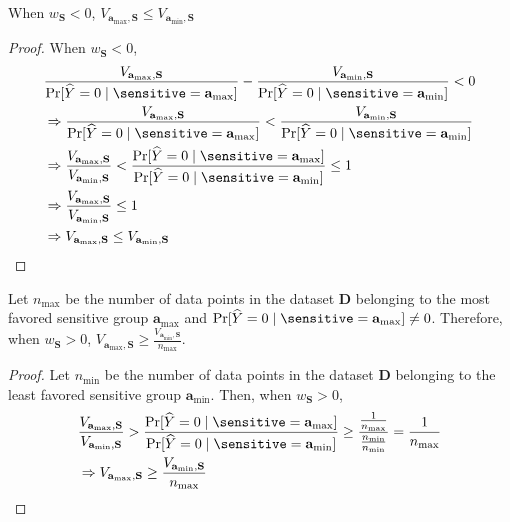 \begin{proposition}
	When $ w_{\mathbf{S}} < 0 $, $ V_{\mathbf{a}_{\max}, \mathbf{S}} \le V_{\mathbf{a}_{\min}, \mathbf{S}}  $
\end{proposition}

\begin{proof}
	When $ w_{\mathbf{S}} < 0 $,
	\begin{align*}
		&\frac{V_{\mathbf{a}_{\max}, \mathbf{S}}}{ \Pr[\widehat{Y} = 0 \mid  \sensitive = \mathbf{a}_{\max}]} - \frac{V_{\mathbf{a}_{\min}, \mathbf{S}} }{\Pr[\widehat{Y} = 0 \mid  \sensitive = \mathbf{a}_{\min}]} < 0 \\
		& \Rightarrow \frac{V_{\mathbf{a}_{\max}, \mathbf{S}}}{ \Pr[\widehat{Y} = 0 \mid  \sensitive = \mathbf{a}_{\max}]} < \frac{V_{\mathbf{a}_{\min}, \mathbf{S}} }{\Pr[\widehat{Y} = 0 \mid  \sensitive = \mathbf{a}_{\min}]} \\
		& \Rightarrow  \frac{V_{\mathbf{a}_{\max}, \mathbf{S}}}{V_{\mathbf{a}_{\min}, \mathbf{S}}} < \frac{\Pr[\widehat{Y} = 0 \mid  \sensitive = \mathbf{a}_{\max}]}{\Pr[\widehat{Y} = 0 \mid  \sensitive = \mathbf{a}_{\min}]} \le 1 \\
		& \Rightarrow \frac{V_{\mathbf{a}_{\max}, \mathbf{S}}}{V_{\mathbf{a}_{\min}, \mathbf{S}}} \le 1 \\ 
		& \Rightarrow V_{\mathbf{a}_{\max}, \mathbf{S}} \le V_{\mathbf{a}_{\min}, \mathbf{S}}
	\end{align*}
\end{proof}

\begin{proposition}
	Let $ n_{\max} $ be the number of data points in the dataset $ \mathbf{D} $ belonging to the most favored sensitive group $ \mathbf{a}_{\max} $ and $ \Pr[\widehat{Y} = 0 \mid  \sensitive = \mathbf{a}_{\max}] \ne 0 $. Therefore, when $ w_{\mathbf{S}} > 0  $, $ V_{\mathbf{a}_{\max}, \mathbf{S}} \ge \frac{V_{\mathbf{a}_{\min}, \mathbf{S}}}{n_{\max}} $.
\end{proposition}

\begin{proof}
Let $ n_{\min} $ be the number of data points in the dataset $ \mathbf{D} $ belonging to the least favored sensitive group $ \mathbf{a}_{\min} $. Then,	when $ w_{\mathbf{S}} > 0 $,
\begin{align*}
	& \frac{V_{\mathbf{a}_{\max}, \mathbf{S}}}{V_{\mathbf{a}_{\min}, \mathbf{S}}} > \frac{\Pr[\widehat{Y} = 0 \mid  \sensitive = \mathbf{a}_{\max}]}{\Pr[\widehat{Y} = 0 \mid  \sensitive = \mathbf{a}_{\min}]} \ge \frac{\frac{1}{n_{\max}}}{\frac{n_{\min}}{n_{\min}}}  = \frac{1}{n_{\max}} \\
	& \Rightarrow V_{\mathbf{a}_{\max}, \mathbf{S}} \ge \frac{V_{\mathbf{a}_{\min}, \mathbf{S}}}{n_{\max}}
\end{align*}

\end{proof}


